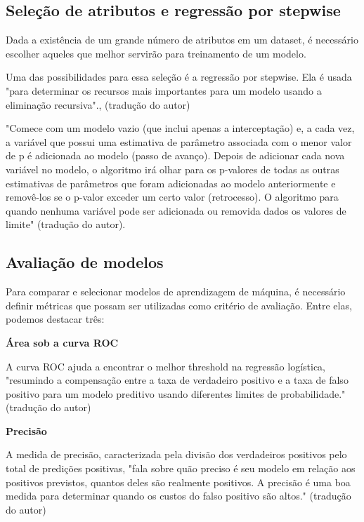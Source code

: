         \subsection{Seleção de atributos e regressão por stepwise}
            Dada a existência de um grande número de atributos em um dataset, é necessário escolher aqueles que melhor servirão para treinamento de um modelo.
        
            Uma das possibilidades para essa seleção é a regressão por stepwise. Ela é usada "para determinar os recursos mais importantes para um modelo usando a eliminação recursiva".\cite{deepdive2020}, (tradução do autor)
            
            "Comece com um modelo vazio (que inclui apenas a interceptação) e, a cada vez, a variável que possui uma estimativa de parâmetro associada com o menor valor de p é adicionada ao modelo (passo de avanço). Depois de adicionar cada nova variável no modelo, o algoritmo irá olhar para os p-valores de todas as outras estimativas de parâmetros que foram adicionadas ao modelo anteriormente e removê-los se o p-valor exceder um certo valor (retrocesso). O algoritmo para quando nenhuma variável pode ser adicionada ou removida dados os valores de limite" \cite{deepdive2020} (tradução do autor).\newline

	    \subsection{Avaliação de modelos}
	    Para comparar e selecionar modelos de aprendizagem de máquina, é necessário definir métricas que possam ser utilizadas como critério de avaliação. Entre elas, podemos destacar três:\newline

            \textbf{Área sob a curva ROC}\par
            A curva ROC ajuda a encontrar o melhor threshold na regressão logística, "resumindo a compensação entre a taxa de verdadeiro positivo e a taxa de falso positivo para um modelo preditivo usando diferentes limites de probabilidade." \cite{mastery2021} (tradução do autor)\newline

            \textbf{Precisão}\par
	        A medida de precisão, caracterizada pela divisão dos verdadeiros positivos pelo total de predições positivas, "fala sobre quão preciso é seu modelo em relação aos positivos previstos, quantos deles são realmente positivos. A precisão é uma boa medida para determinar quando os custos do falso positivo são altos." \cite{towards2020} (tradução do autor)\newline

